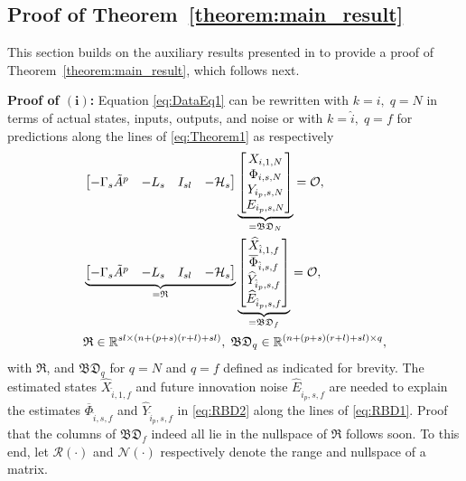 \subsection{Proof of Theorem~\ref{theorem:main_result}}%
This section builds on the auxiliary results presented in  to provide a proof of Theorem~\ref{theorem:main_result}, which follows next.

\noindent\textbf{Proof of $\mathrm{\mathbf{(i)}}$:} 
Equation \eqref{eq:DataEq1} can be rewritten with $k=i,\;q=N$ in terms of actual states, inputs, outputs, and noise or with $k=\hat{i},\;q=f$ for predictions along the lines of \eqref{eq:Theorem1} as respectively
\begin{align}
    &\begin{bmatrix}-\Gamma_s \tilde{A}^p & -L_s & I_{sl}&-\mathcal{H}_s\end{bmatrix}
    \underbrace{\begin{bmatrix}
        X_{i,1,N}\\
        \Phi_{i,s,N}\\
        Y_{i_p,s,N}\\
        E_{i_p,s,N}
    \end{bmatrix}}_{=\mathfrak{BD}_N}=\mathcal{O},\label{eq:RBD1}\\
    &\underbrace{\begin{bmatrix}-\Gamma_s \tilde{A}^p & -L_s & I_{sl}&-\mathcal{H}_s\end{bmatrix}}_{= \mathfrak{R}}
    \underbrace{\begin{bmatrix}
        \widehat{X}_{\hat{i},1,f}\\
        \overline{\Phi}_{\hat{i},s,f}\\
        \widehat{Y}_{\hat{i}_p,s,f}\\
        \widehat{E}_{\hat{i}_p,s,f}
    \end{bmatrix}}_{=\mathfrak{BD}_f}=\mathcal{O},\label{eq:RBD2}\\
    &\mathfrak{R}\in\mathbb{R}^{sl\times (n+(p+s)(r+l)+sl)},\;\mathfrak{BD}_q\in\mathbb{R}^{(n+(p+s)(r+l)+sl) \times q},\notag
\end{align}
with $\mathfrak{R}$, and $\mathfrak{BD}_q$ for $q=N$ and $q=f$ defined as indicated for brevity. The estimated states $\widehat{X}_{\hat{i},1,f}$ and future innovation noise $\widehat{E}_{\hat{i}_p,s,f}$ are needed to explain the estimates $\overline{\Phi}_{\hat{i},s,f}$ and $\widehat{Y}_{\hat{i}_p,s,f}$ in \eqref{eq:RBD2} along the lines of \eqref{eq:RBD1}. Proof that the columns of $\mathfrak{BD}_f$ indeed all lie in the nullspace of $\mathfrak{R}$ follows soon. To this end, let $\mathcal{R}(\cdot)$ and $\mathcal{N}(\cdot)$ respectively denote the range and nullspace of a matrix.

